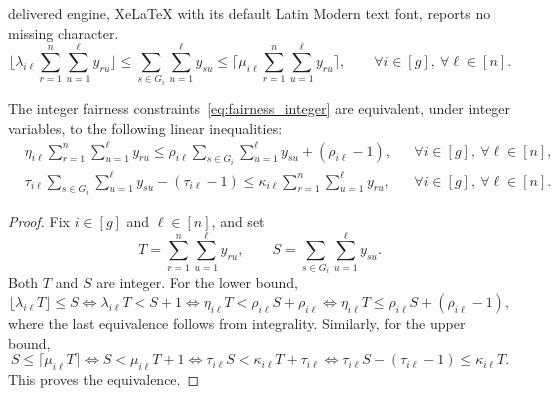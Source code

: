 \documentclass[10pt,a4paper]{amsart}
\begin{document}
delivered engine, XeLaTeX with its default Latin Modern text font, reports no missing character.
\begin{equation}\label{eq:fairness_integer}
\biggl\lfloor 
\lambda_{i\ell}\sum_{r=1}^n\sum_{u=1}^{\ell}y_{ru}
\biggr\rfloor
\le
\sum_{s\in G_i}\sum_{u=1}^{\ell}y_{su}
\le
\biggl\lceil 
\mu_{i\ell}\sum_{r=1}^n\sum_{u=1}^{\ell}y_{ru}
\biggr\rceil,
\qquad
\forall i\in[g],\ \forall \ell\in[n].
\end{equation}

\begin{lemma}\label{lem:linearization}
The integer fairness constraints~\eqref{eq:fairness_integer} are equivalent, under integer variables, to the following linear inequalities:
\begin{subequations}\label{eq:linearized_fairness}
\begin{align}
& \eta_{i\ell}\sum_{r=1}^n\sum_{u=1}^{\ell}y_{ru}
\le
\rho_{i\ell}\sum_{s\in G_i}\sum_{u=1}^{\ell}y_{su}
+(\rho_{i\ell}-1),
&& \forall i\in[g],\ \forall \ell\in[n],
\label{eq:linearized_fairness_lower}\\
& \tau_{i\ell}\sum_{s\in G_i}\sum_{u=1}^{\ell}y_{su}
-(\tau_{i\ell}-1)
\le
\kappa_{i\ell}\sum_{r=1}^n\sum_{u=1}^{\ell}y_{ru},
&& \forall i\in[g],\ \forall \ell\in[n].
\label{eq:linearized_fairness_upper}
\end{align}
\end{subequations}
\end{lemma}

\begin{proof}
Fix \(i\in[g]\) and \(\ell\in[n]\), and set
\[
T=\sum_{r=1}^n\sum_{u=1}^{\ell}y_{ru},
\qquad
S=\sum_{s\in G_i}\sum_{u=1}^{\ell}y_{su}.
\]
Both \(T\) and \(S\) are integer. For the lower bound,
\[
\lfloor \lambda_{i\ell}T\rfloor \le S
\Longleftrightarrow
\lambda_{i\ell}T<S+1
\Longleftrightarrow
\eta_{i\ell}T<\rho_{i\ell}S+\rho_{i\ell}
\Longleftrightarrow
\eta_{i\ell}T\le \rho_{i\ell}S+(\rho_{i\ell}-1),
\]
where the last equivalence follows from integrality. Similarly, for the upper bound,
\[
S\le \lceil \mu_{i\ell}T\rceil
\Longleftrightarrow
S<\mu_{i\ell}T+1
\Longleftrightarrow
\tau_{i\ell}S<\kappa_{i\ell}T+\tau_{i\ell}
\Longleftrightarrow
\tau_{i\ell}S-(\tau_{i\ell}-1)\le \kappa_{i\ell}T.
\]
This proves the equivalence.
\end{proof}
\end{document}
